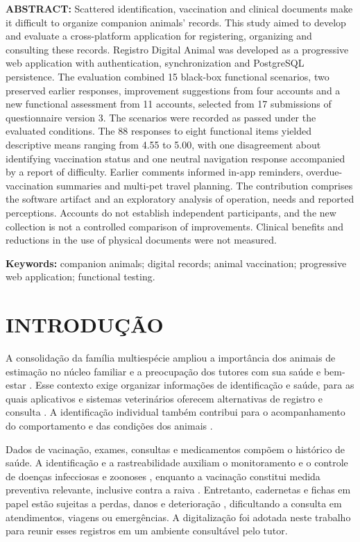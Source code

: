 \documentclass{UNESC}
\begin{document}
\vspace{1.0em}
\noindent
\newpage
\textbf{ABSTRACT:} Scattered identification, vaccination and clinical documents make it difficult to organize companion animals' records. This study aimed to develop and evaluate a cross-platform application for registering, organizing and consulting these records. Registro Digital Animal was developed as a progressive web application with authentication, synchronization and PostgreSQL persistence. The evaluation combined 15 black-box functional scenarios, two preserved earlier responses, improvement suggestions from four accounts and a new functional assessment from 11 accounts, selected from 17 submissions of questionnaire version 3. The scenarios were recorded as passed under the evaluated conditions. The 88 responses to eight functional items yielded descriptive means ranging from 4.55 to 5.00, with one disagreement about identifying vaccination status and one neutral navigation response accompanied by a report of difficulty. Earlier comments informed in-app reminders, overdue-vaccination summaries and multi-pet travel planning. The contribution comprises the software artifact and an exploratory analysis of operation, needs and reported perceptions. Accounts do not establish independent participants, and the new collection is not a controlled comparison of improvements. Clinical benefits and reductions in the use of physical documents were not measured.

\vspace{0.5em}
\noindent
\textbf{Keywords:} companion animals; digital records; animal vaccination; progressive web application; functional testing.

\section{INTRODUÇÃO}

A consolidação da família multiespécie ampliou a importância dos animais de estimação no núcleo familiar e a preocupação dos tutores com sua saúde e bem-estar \cite{BOLSON2022,VIEIRA2020}. Esse contexto exige organizar informações de identificação e saúde, para as quais aplicativos e sistemas veterinários oferecem alternativas de registro e consulta \cite{MORAES2024}. A identificação individual também contribui para o acompanhamento do comportamento e das condições dos animais \cite{vidal2021}.

Dados de vacinação, exames, consultas e medicamentos compõem o histórico de saúde. A identificação e a rastreabilidade auxiliam o monitoramento e o controle de doenças infecciosas e zoonoses \cite{murphy2008}, enquanto a vacinação constitui medida preventiva relevante, inclusive contra a raiva \cite{MOUTINHO2017}. Entretanto, cadernetas e fichas em papel estão sujeitas a perdas, danos e deterioração \cite{BOLSON2022}, dificultando a consulta em atendimentos, viagens ou emergências. A digitalização foi adotada neste trabalho para reunir esses registros em um ambiente consultável pelo tutor.
\end{document}
